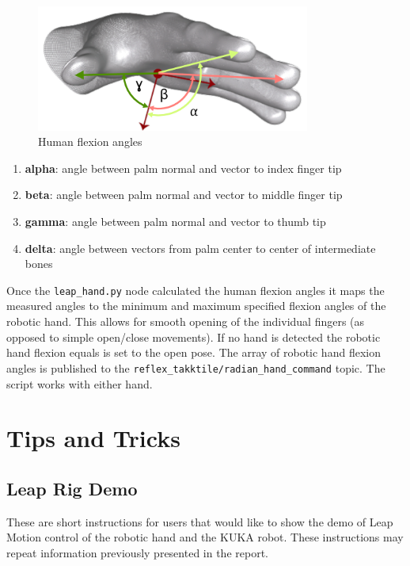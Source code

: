 \documentclass[headsepline,footinclude=false,fontsize=11pt,paper=a4,listof=totoc,bibliography=totoc,BCOR=12mm,DIV=14]{scrbook}
\begin{document}
\newpage
\begin{figure}[h]
    \centering
    \includegraphics[width=9cm]{images/hand_angles}
    \caption{Human flexion angles \cite{LeapHand}}
    \label{fig:human_flexion}
\end{figure}

\begin{enumerate}
	\item \textbf{alpha}: angle between palm normal and vector to index finger tip
	\item \textbf{beta}: angle between palm normal and vector to middle finger tip
	\item \textbf{gamma}: angle between palm normal and vector to thumb tip
	\item \textbf{delta}: angle between vectors from palm center to center of intermediate bones
\end{enumerate}

Once the \texttt{leap\_hand.py} node calculated the human flexion angles it maps the measured angles to the minimum and maximum specified flexion angles of the robotic hand. This allows for smooth opening of the individual fingers (as opposed to simple open/close movements). If no hand is detected the robotic hand flexion equals is set to the open pose. The  array of robotic hand flexion angles is published to the \texttt{reflex\_takktile/radian\_hand\_command} topic. The script works with either hand.


\chapter{Tips and Tricks}
\section{Leap Rig Demo}

These are short instructions for users that would like to show the demo of Leap Motion control of the robotic hand and the KUKA robot. These instructions may repeat information previously presented in the report.
\end{document}
